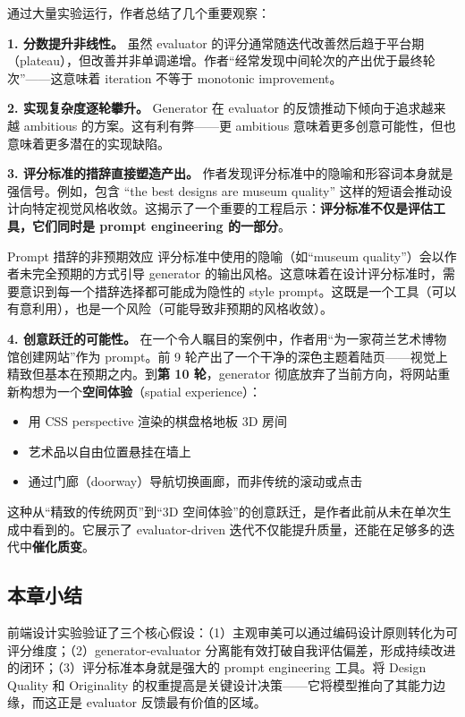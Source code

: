 \documentclass[a4paper]{article}
\begin{document}
通过大量实验运行，作者总结了几个重要观察：

\textbf{1. 分数提升非线性。} 虽然 evaluator 的评分通常随迭代改善然后趋于平台期（plateau），但改善并非单调递增。作者``经常发现中间轮次的产出优于最终轮次''——这意味着 iteration 不等于 monotonic improvement。

\textbf{2. 实现复杂度逐轮攀升。} Generator 在 evaluator 的反馈推动下倾向于追求越来越 ambitious 的方案。这有利有弊——更 ambitious 意味着更多创意可能性，但也意味着更多潜在的实现缺陷。

\textbf{3. 评分标准的措辞直接塑造产出。} 作者发现评分标准中的隐喻和形容词本身就是强信号。例如，包含 ``the best designs are museum quality'' 这样的短语会推动设计向特定视觉风格收敛。这揭示了一个重要的工程启示：\textbf{评分标准不仅是评估工具，它们同时是 prompt engineering 的一部分}。

\begin{warningbox}{Prompt 措辞的非预期效应}
评分标准中使用的隐喻（如``museum quality''）会以作者未完全预期的方式引导 generator 的输出风格。这意味着在设计评分标准时，需要意识到每一个措辞选择都可能成为隐性的 style prompt。这既是一个工具（可以有意利用），也是一个风险（可能导致非预期的风格收敛）。
\end{warningbox}

\textbf{4. 创意跃迁的可能性。} 在一个令人瞩目的案例中，作者用``为一家荷兰艺术博物馆创建网站''作为 prompt。前 9 轮产出了一个干净的深色主题着陆页——视觉上精致但基本在预期之内。到\textbf{第 10 轮}，generator 彻底放弃了当前方向，将网站重新构想为一个\textbf{空间体验}（spatial experience）：

\begin{itemize}[leftmargin=1.5em]
    \item 用 CSS perspective 渲染的棋盘格地板 3D 房间
    \item 艺术品以自由位置悬挂在墙上
    \item 通过门廊（doorway）导航切换画廊，而非传统的滚动或点击
\end{itemize}

这种从``精致的传统网页''到``3D 空间体验''的创意跃迁，是作者此前从未在单次生成中看到的。它展示了 evaluator-driven 迭代不仅能提升质量，还能在足够多的迭代中\textbf{催化质变}。

\subsection{本章小结}

前端设计实验验证了三个核心假设：（1）主观审美可以通过编码设计原则转化为可评分维度；（2）generator-evaluator 分离能有效打破自我评估偏差，形成持续改进的闭环；（3）评分标准本身就是强大的 prompt engineering 工具。将 Design Quality 和 Originality 的权重提高是关键设计决策——它将模型推向了其能力边缘，而这正是 evaluator 反馈最有价值的区域。
\end{document}
